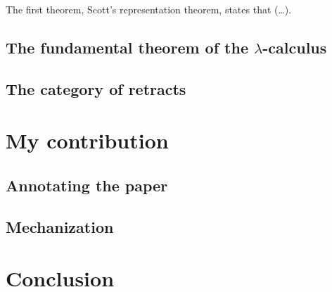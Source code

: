 \documentclass{amsart}
\begin{document}
  The first theorem, Scott's representation theorem, states that (\dots).

  \subsection{The fundamental theorem of the $\lambda$-calculus}

  \subsection{The category of retracts}

  \section{My contribution}

  \subsection{Annotating the paper}

  \subsection{Mechanization}

  \section{Conclusion}
\end{document}
